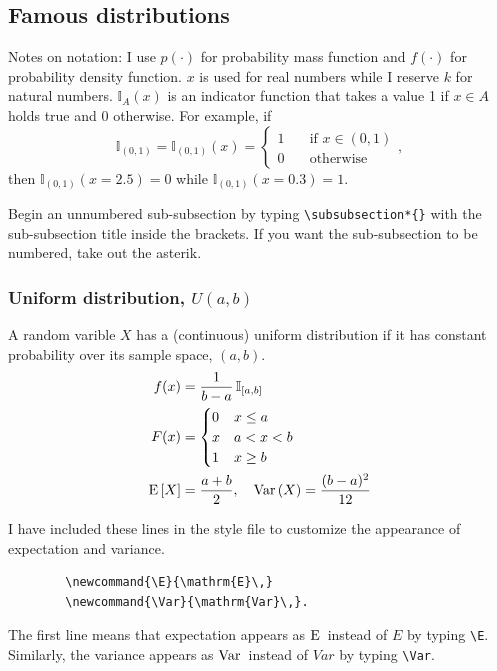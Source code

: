 \documentclass[12pt, notitlepage]{article}
\begin{document}
\subsection{Famous distributions}

Notes on notation: I use $p(\cdot)$ for probability mass function and $f(\cdot)$ for probability density function. $x$ is used for real numbers while I reserve $k$ for natural numbers. $\mathbb{I}_{A}(x)$ is an indicator function that takes a value 1 if $x \in A$ holds true and 0 otherwise. For example, if
	$$\mathbb{I}_{(0,1)} = \mathbb{I}_{(0,1)}(x) = \begin{cases} 
									1 & \quad \text{if $x \in (0,1)$} \\
									0 & \quad \text{otherwise} \end{cases},$$
then $\mathbb{I}_{(0,1)}(x=2.5) = 0$ while $\mathbb{I}_{(0,1)}(x=0.3) = 1$.
	
\begin{notes}
Begin an unnumbered sub-subsection by typing \verb|\subsubsection*{}| with the sub-subsection title inside the brackets. If you want the sub-subsection to be numbered, take out the asterik. 
\end{notes}


\subsubsection*{Uniform distribution, $U(a,b)$}
A random varible $X$ has a (continuous) uniform distribution if it has constant probability over its sample space, $(a, b)$. 
\begin{align*}
f(x) &= \dfrac{1}{b-a}\, \mathbb{I}_{[a,b]}\\
F(x) &= \begin{cases} 0 & x \leq a \\
                x & a < x < b \\
                1 & x \geq b \end{cases} \\
\E[X] &= \dfrac{a+b}{2}, \quad  \Var(X) = \dfrac{(b-a)^2}{12}
\end{align*}

\begin{notes}
I have included these lines in the style file  to customize the appearance of expectation and variance. 
        \begin{verbatim}
        \newcommand{\E}{\mathrm{E}\,}
        \newcommand{\Var}{\mathrm{Var}\,}.
        \end{verbatim}
The first line means that expectation appears as $\E$ instead of $E$ by typing \verb|\E|. Similarly, the variance appears as $\Var$ instead of $Var$ by typing \verb|\Var|. 
\end{notes}
\end{document}
